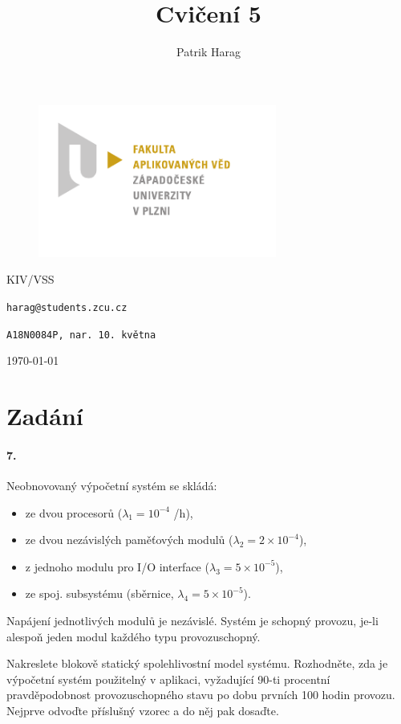 \documentclass[12pt, a4paper]{article}
\title{Cvičení 5}
\author{Patrik Harag}
\makeatletter
\def \thesubtitle {KIV/VSS}
\def \theauthoremail {harag@students.zcu.cz}
\def \theauthorid {A18N0084P, nar. 10. května}
\makeatother
\begin{document}
\begin{titlepage}
	\begin{figure}
		\includegraphics[height=50mm]{img-fav-logo}
	\end{figure}
	
	\centering
	{\large \hspace{1mm} \par} %
	\vspace{15ex}
	
	{\huge\bfseries \thetitle \par}
	\vspace{2ex}
	{\scshape\Large \thesubtitle \par}
	\vspace{15ex}
	{\Large\itshape \theauthor \par}
	\vspace{2ex}
	{\texttt{\theauthoremail} \par}
	\vspace{1ex}
	{\texttt{\theauthorid} \par}
	
	\vfill

	{\today\par}
\end{titlepage}

\section*{Zadání}

\paragraph{7.}
Neobnovovaný výpočetní systém se skládá:
\begin{itemize}
	\item ze dvou procesorů ($\lambda_{1} = 10^{-4}$ /h),
	\item ze dvou nezávislých paměťových modulů ($\lambda_{2}  = 2\times10^{-4}$),
	\item z jednoho modulu pro I/O interface ($\lambda_{3} = 5\times10^{-5}$),
	\item ze spoj. subsystému (sběrnice, $\lambda_{4} = 5\times10^{-5}$).
\end{itemize}
Napájení jednotlivých modulů je nezávislé. Systém je schopný provozu, je-li alespoň jeden modul každého typu provozuschopný.

Nakreslete blokově statický spolehlivostní model systému.
Rozhodněte, zda je výpočetní systém použitelný v aplikaci, vyžadující 90-ti procentní pravděpodobnost provozuschopného stavu po dobu prvních 100 hodin provozu. Nejprve odvoďte příslušný vzorec a do něj pak dosaďte.


\end{document}
